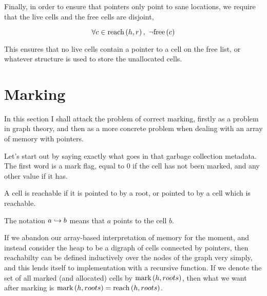 Finally, in order to ensure that pointers only point to sane
locations, we require that the live cells and the free cells are
disjoint,

\begin{definition}
  \label{def:ms-live-cell-invariant}
  \[\forall c \in \reach{h}{r},\ \lnot\free{c}\]
\end{definition}

This ensures that no live cells contain a pointer to a cell on the
free list, or whatever structure is used to store the unallocated
cells.

\section{Marking}
\label{sec:marksweep-marking}

In this section I shall attack the problem of correct marking, firstly
as a problem in graph theory, and then as a more concrete problem when
dealing with an array of memory with pointers.

Let's start out by saying exactly what goes in that garbage collection
metadata. The first word is a mark flag, equal to 0 if the cell has
not been marked, and any other value if it has.

\begin{definition}[Reachable]
  \label{def:ms-reachable}
  A cell is reachable if it is pointed to by a root, or pointed to by
  a cell which is reachable.

  \begin{minipage}{.5\textwidth}
    \begin{prooftree}
    \end{prooftree}
  \end{minipage}
  \begin{minipage}{.5\textwidth}
    \begin{prooftree}
    \end{prooftree}
  \end{minipage}

  The notation $a \pointsto b$ means that $a$ points to the cell $b$.
\end{definition}

If we abandon our array-based interpretation of memory for the moment,
and instead consider the heap to be a digraph of cells connected by
pointers, then reachabilty can be defined inductively over the nodes
of the graph very simply, and this lends itself to implementation with
a recursive function. If we denote the set of all marked (and
allocated) cells by $\markset{h}{roots}$, then what we want after
marking is $\markset{h}{roots} = \reach{h}{roots}$.


